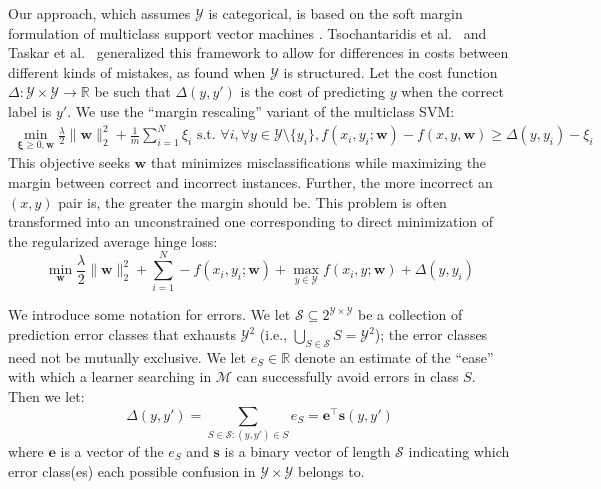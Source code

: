 \documentclass{article} %
\begin{document}
Our approach, which assumes $\mathcal{Y}$ is categorical, is based on
the soft margin formulation of multiclass support vector machines
\citep{vapnik1998statistical,crammer2002algorithmic,weston1998multi}.
Tsochantaridis et al.~\citep{tsochantaridis2004support} and Taskar et
al.~\citep{koller2003max} generalized this framework to allow for
differences in costs between different kinds of mistakes, as found
when $\mathcal{Y}$ is structured.  Let the cost function
$\Delta:\mathcal{Y}\times\mathcal{Y}\rightarrow\mathbb{R}$  be such
that $\Delta(y, y')$ is the cost of predicting $y$ when the correct
label is $y'$.  We use the ``margin rescaling'' variant of the multiclass SVM:
\begin{align}
 \min_{\boldsymbol{\xi}\geq 0, \mathbf{w}}
\frac{\lambda}{2}\|\mathbf{w}\|_2^2+\frac{1}{m}\sum_{i=1}^N\xi_i 
 \text{\ \ \ s.t.\ \ \ } \forall i,  \forall y \in \mathcal{Y} \setminus
 \{y_i\},  f(x_i, y_i; \mathbf{w}) - f(x, y, \mathbf{w}) \geq
 \Delta(y, y_i) - \xi_i \label{marginRescaling}
\end{align}
This objective seeks $\mathbf{w}$ that minimizes misclassifications while
maximizing the margin between correct and incorrect instances.
Further, the more incorrect an $(x,y)$ pair is, the greater the margin
should be.  This problem is often transformed into an unconstrained
one corresponding to direct minimization of the regularized average
hinge loss:
\begin{equation}
\label{svmObjective}
\min_{\mathbf{w}} \frac{\lambda}{2}\|\mathbf{w}\|_2^2 +
\sum_{i=1}^N  -f(x_i, y_i; \mathbf{w}) + \max_{y \in \mathcal{Y}}
  f(x_i, y; \mathbf{w}) + \Delta(y, y_i)
\end{equation}

We introduce some notation for errors.
We let $\mathcal{S} \subseteq 2^{\mathcal{Y}\times\mathcal{Y}}$ be a
collection of prediction error classes that 
exhausts $\mathcal{Y}^2$ (i.e., $\bigcup_{S \in
  \mathcal{S}} S = \mathcal{Y}^2$); the error 
  classes need not be
mutually exclusive.  We let $e_{S} \in \mathbb{R}$ denote an estimate
of the ``ease'' with which a learner searching in $\mathcal{M}$ 
can successfully avoid errors in class $S$.  Then we let:
\begin{equation}
\Delta(y, y') = \sum_{S \in \mathcal{S}: (y, y') \in S} e_S =
\mathbf{e}^\top \mathbf{s}(y, y')
\end{equation}
where $\mathbf{e}$ is a vector of the $e_S$ and $\mathbf{s}$ is a
binary vector of length $\mathcal{S}$ indicating which error class(es)
each possible confusion in $\mathcal{Y}\times\mathcal{Y}$ belongs to.
\end{document}
